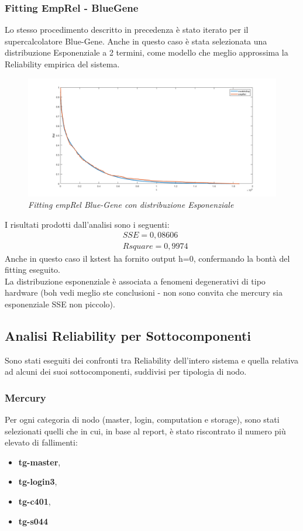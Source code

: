 \subsubsection{Fitting EmpRel - BlueGene}
Lo stesso procedimento descritto in precedenza è stato iterato per il supercalcolatore Blue-Gene. Anche in questo caso è stata selezionata una distribuzione Esponenziale a 2 termini, come modello che meglio approssima la Reliability empirica del sistema.
\begin{figure}[H]
	\centering
	\includegraphics[width=\textwidth]{img/hw6/FittingBG.png}
	\caption{\textit{Fitting empRel Blue-Gene con distribuzione Esponenziale}}
\end{figure}
I risultati prodotti dall'analisi sono i seguenti:
\begin{equation*}
	\begin{split}
		&SSE = 0,08606\\
		&Rsquare = 0,9974
	\end{split}
\end{equation*}
Anche in questo caso il kstest ha fornito output h=0, confermando la bontà del fitting eseguito.
\\
La distribuzione esponenziale è associata a fenomeni degenerativi di tipo hardware (boh vedi meglio ste conclusioni - non sono convita che mercury sia esponenziale SSE non piccolo).
\subsection{Analisi Reliability per Sottocomponenti}
Sono stati eseguiti dei confronti tra Reliability dell'intero sistema e quella relativa ad alcuni dei suoi sottocomponenti, suddivisi per tipologia di nodo. 
\subsubsection{Mercury}
Per ogni categoria di nodo (master, login, computation e storage), sono stati selezionati quelli che in cui, in base al report, è stato riscontrato il numero più elevato di fallimenti:
\begin{itemize}
	\item \textbf{tg-master},
	\item \textbf{tg-login3},
	\item \textbf{tg-c401},
	\item \textbf{tg-s044}
\end{itemize}

